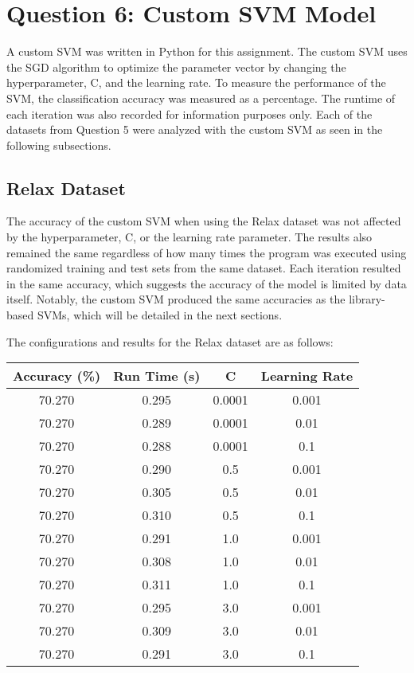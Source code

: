 \documentclass[letterpaper]{article}
\begin{document}
\section{Question 6: Custom SVM Model}
A custom SVM was written in Python for this assignment. The custom SVM uses the SGD algorithm to optimize the parameter vector by changing the hyperparameter, C, and the learning rate. To measure the performance of the SVM, the classification accuracy was measured as a percentage. The runtime of each iteration was also recorded for information purposes only. Each of the datasets from Question 5 were analyzed with the custom SVM as seen in the following subsections.

\subsection{Relax Dataset}
The accuracy of the custom SVM when using the Relax dataset was not affected by the hyperparameter, C, or the learning rate parameter. The results also remained the same regardless of how many times the program was executed using randomized training and test sets from the same dataset. Each iteration resulted in the same accuracy, which suggests the accuracy of the model is limited by data itself. Notably, the custom SVM produced the same accuracies as the library-based SVMs, which will be detailed in the next sections.

The configurations and results for the Relax dataset are as follows:
\begin{center}
\begin{tabular}{|c c c c|} 
 \hline
 Accuracy (\%) & Run Time (s) & C & Learning Rate \\
 \hline
 70.270 & 0.295 & 0.0001 & 0.001 \\
 \hline
 70.270 & 0.289 & 0.0001 & 0.01 \\
 \hline
 70.270 & 0.288 & 0.0001 & 0.1 \\
 \hline
 70.270 & 0.290 & 0.5    & 0.001 \\
 \hline
 70.270 & 0.305 & 0.5    & 0.01 \\
 \hline
 70.270 & 0.310 & 0.5    & 0.1 \\
 \hline
 70.270 & 0.291 & 1.0    & 0.001 \\
 \hline
 70.270 & 0.308 & 1.0    & 0.01 \\
 \hline
 70.270 & 0.311 & 1.0    & 0.1 \\
 \hline
 70.270 & 0.295 & 3.0    & 0.001 \\
 \hline
 70.270 & 0.309 & 3.0    & 0.01 \\
 \hline
 70.270 & 0.291 & 3.0    & 0.1 \\
 \hline
\end{tabular}
\end{center}
\end{document}

